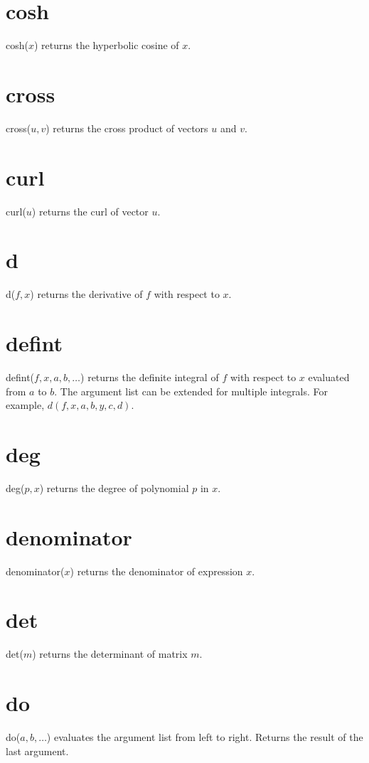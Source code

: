 \documentclass[11pt]{article}
\begin{document}
\section*{cosh}
cosh($x$) returns the hyperbolic cosine of $x$.

\section*{cross}
cross($u,v$) returns the cross product of vectors $u$ and $v$.

\section*{curl}
curl($u$) returns the curl of vector $u$.

\section*{d}
d($f,x$) returns the derivative of $f$ with respect to $x$.

\section*{defint}
defint($f,x,a,b,\ldots$)
returns the definite integral of $f$ with respect to $x$ evaluated from $a$ to $b$.
The argument list can be extended for multiple integrals.
For example, $d(f,x,a,b,y,c,d)$.

\section*{deg}
deg($p,x$) returns the degree of polynomial $p$ in $x$.

\section*{denominator}
denominator($x$) returns the denominator of expression $x$.

\section*{det}
det($m$) returns the determinant of matrix $m$.

\section*{do}
do($a,b,\ldots$) evaluates the argument list from left to right.
Returns the result of the last argument.
\end{document}

